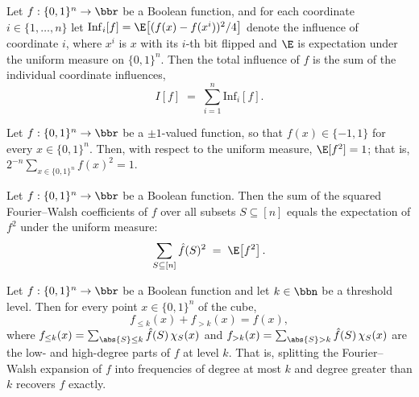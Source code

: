 \begin{lemma}
\label{KKL.totalInfluence_eq_sum_influences}
\leanok
{}
Let $f : \{0,1\}^n \to \bbr$ be a Boolean function, and for each coordinate $i \in
\{1,\dots,n\}$ let $\mathrm{Inf}_i[f] = \E\!\left[(f(x)-f(x^i))^2/4\right]$ denote the
influence of coordinate $i$, where $x^i$ is $x$ with its $i$-th bit flipped and $\E$ is
expectation under the uniform measure on $\{0,1\}^n$. Then the total influence of $f$ is
the sum of the individual coordinate influences,
\[
  I[f] \;=\; \sum_{i=1}^{n} \mathrm{Inf}_i[f].
\]
\end{lemma}

\begin{lemma}
\label{KKL.expect_sq_pm_one}
\leanok
{}
Let $f : \{0,1\}^n \to \bbr$ be a $\pm 1$-valued function, so that $f(x) \in \{-1, 1\}$
for every $x \in \{0,1\}^n$. Then, with respect to the uniform measure, $\E[f^2] = 1$;
that is, $2^{-n}\sum_{x \in \{0,1\}^n} f(x)^2 = 1$.
\end{lemma}

\begin{lemma}
\label{KKL.sum_fourier_sq_eq_expect_sq}
\leanok
{}
Let $f : \{0,1\}^n \to \bbr$ be a Boolean function. Then the sum of the squared
Fourier--Walsh coefficients of $f$ over all subsets $S \subseteq [n]$ equals the
expectation of $f^2$ under the uniform measure:
\[
  \sum_{S \subseteq [n]} \hat f(S)^2 \;=\; \E\!\left[f^2\right].
\]
\end{lemma}

\begin{lemma}
\label{KKL.low_plus_high_eq}
\leanok
{}
Let $f : \{0,1\}^n \to \bbr$ be a Boolean function and let $k \in \bbn$ be a threshold
level. Then for every point $x \in \{0,1\}^n$ of the cube,
\[
  f_{\le k}(x) + f_{>k}(x) = f(x),
\]
where $f_{\le k}(x) = \sum_{\abs{S}\le k}\hat f(S)\,\chi_S(x)$ and $f_{>k}(x) =
\sum_{\abs{S} > k}\hat f(S)\,\chi_S(x)$ are the low- and high-degree parts of $f$ at
level $k$. That is, splitting the Fourier–Walsh expansion of $f$ into frequencies of
degree at most $k$ and degree greater than $k$ recovers $f$ exactly.
\end{lemma}

